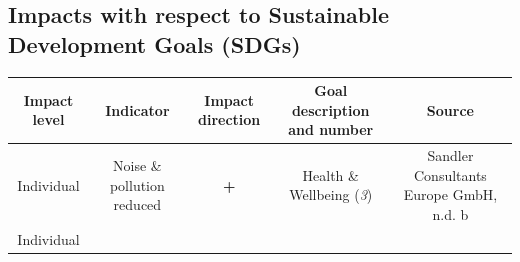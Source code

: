 \documentclass[
]{book}
\begin{document}
\hypertarget{impacts-with-respect-to-sustainable-development-goals-sdgs-10}{%
\subsection*{Impacts with respect to Sustainable Development Goals (SDGs)}\label{impacts-with-respect-to-sustainable-development-goals-sdgs-10}}

\begin{longtable}[]{@{}ccccc@{}}
\toprule
\begin{minipage}[b]{0.17\columnwidth}\centering
Impact level\strut
\end{minipage} & \begin{minipage}[b]{0.16\columnwidth}\centering
Indicator\strut
\end{minipage} & \begin{minipage}[b]{0.17\columnwidth}\centering
Impact direction\strut
\end{minipage} & \begin{minipage}[b]{0.17\columnwidth}\centering
Goal description and number\strut
\end{minipage} & \begin{minipage}[b]{0.17\columnwidth}\centering
Source\strut
\end{minipage}\tabularnewline
\midrule
\endhead
\begin{minipage}[t]{0.17\columnwidth}\centering
Individual\strut
\end{minipage} & \begin{minipage}[t]{0.16\columnwidth}\centering
Noise \& pollution reduced\strut
\end{minipage} & \begin{minipage}[t]{0.17\columnwidth}\centering
\textbf{+}\strut
\end{minipage} & \begin{minipage}[t]{0.17\columnwidth}\centering
Health \& Wellbeing (\emph{3})\strut
\end{minipage} & \begin{minipage}[t]{0.17\columnwidth}\centering
Sandler Consultants Europe GmbH, n.d. b\strut
\end{minipage}\tabularnewline
\begin{minipage}[t]{0.17\columnwidth}\centering
Individual\strut
\end{minipage} & \begin{minipage}[t]{0.16\columnwidth}\centering

\end{minipage}
\end{longtable}
\end{document}
